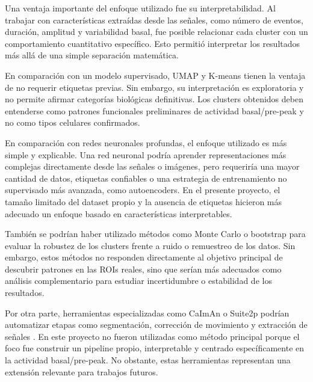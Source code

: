 \documentclass[10pt,twocolumn]{article}
\begin{document}
Una ventaja importante del enfoque utilizado fue su interpretabilidad. Al trabajar con características extraídas desde las señales, como número de eventos, duración, amplitud y variabilidad basal, fue posible relacionar cada cluster con un comportamiento cuantitativo específico. Esto permitió interpretar los resultados más allá de una simple separación matemática.

En comparación con un modelo supervisado, UMAP y K-means tienen la ventaja de no requerir etiquetas previas. Sin embargo, su interpretación es exploratoria y no permite afirmar categorías biológicas definitivas. Los clusters obtenidos deben entenderse como patrones funcionales preliminares de actividad basal/pre-peak y no como tipos celulares confirmados.

En comparación con redes neuronales profundas, el enfoque utilizado es más simple y explicable. Una red neuronal podría aprender representaciones más complejas directamente desde las señales o imágenes, pero requeriría una mayor cantidad de datos, etiquetas confiables o una estrategia de entrenamiento no supervisado más avanzada, como autoencoders. En el presente proyecto, el tamaño limitado del dataset propio y la ausencia de etiquetas hicieron más adecuado un enfoque basado en características interpretables.

También se podrían haber utilizado métodos como Monte Carlo o bootstrap para evaluar la robustez de los clusters frente a ruido o remuestreo de los datos. Sin embargo, estos métodos no responden directamente al objetivo principal de descubrir patrones en las ROIs reales, sino que serían más adecuados como análisis complementario para estudiar incertidumbre o estabilidad de los resultados.

Por otra parte, herramientas especializadas como CaImAn o Suite2p podrían automatizar etapas como segmentación, corrección de movimiento y extracción de señales \cite{caiman2019,suite2p2020}. En este proyecto no fueron utilizadas como método principal porque el foco fue construir un pipeline propio, interpretable y centrado específicamente en la actividad basal/pre-peak. No obstante, estas herramientas representan una extensión relevante para trabajos futuros.
\end{document}
